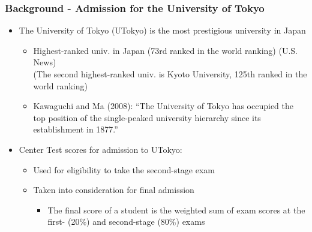 \documentclass[10pt, pdfmx,hiresbb]{beamer}
\begin{document}
\begin{frame}\frametitle{Background - Admission for the University of Tokyo}
  \begin{itemize}
    \item The University of Tokyo (UTokyo) is the most prestigious university in Japan
      \begin{itemize}
        \item Highest-ranked univ. in Japan (73rd ranked in the world ranking) (U.S. News) \\
          (The second highest-ranked univ. is Kyoto University, 125th ranked in the world ranking)
        \item Kawaguchi and Ma (2008): ``The University of Tokyo has occupied the top position of the single-peaked university hierarchy since its establishment in 1877.''
      \end{itemize}
    \item Center Test scores for admission to UTokyo:
      \begin{itemize}
        \item Used for eligibility to take the second-stage exam
        \item Taken into consideration for final admission 
          \begin{itemize}
            \item The final score of a student is the weighted sum of exam scores at the first- (20\%) and second-stage (80\%) exams
          \end{itemize}
      \end{itemize}
  \end{itemize}
\end{frame}

\end{document}
